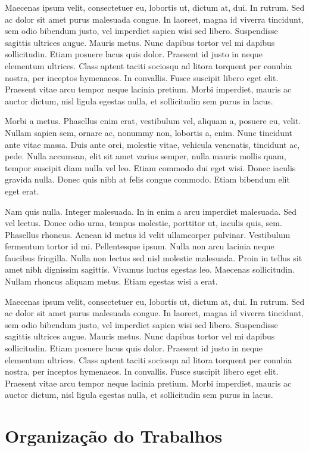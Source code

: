 Maecenas ipsum velit, consectetuer eu, lobortis ut, dictum at, dui. In rutrum. Sed ac dolor sit amet purus malesuada congue. In laoreet, magna id viverra tincidunt, sem odio bibendum justo, vel imperdiet sapien wisi sed libero. Suspendisse sagittis ultrices augue. Mauris metus. Nunc dapibus tortor vel mi dapibus sollicitudin. Etiam posuere lacus quis dolor. Praesent id justo in neque elementum ultrices. Class aptent taciti sociosqu ad litora torquent per conubia nostra, per inceptos hymenaeos. In convallis. Fusce suscipit libero eget elit. Praesent vitae arcu tempor neque lacinia pretium. Morbi imperdiet, mauris ac auctor dictum, nisl ligula egestas nulla, et sollicitudin sem purus in lacus.

Morbi a metus. Phasellus enim erat, vestibulum vel, aliquam a, posuere eu, velit. Nullam sapien sem, ornare ac, nonummy non, lobortis a, enim. Nunc tincidunt ante vitae massa. Duis ante orci, molestie vitae, vehicula venenatis, tincidunt ac, pede. Nulla accumsan, elit sit amet varius semper, nulla mauris mollis quam, tempor suscipit diam nulla vel leo. Etiam commodo dui eget wisi. Donec iaculis gravida nulla. Donec quis nibh at felis congue commodo. Etiam bibendum elit eget erat.

Nam quis nulla. Integer malesuada. In in enim a arcu imperdiet malesuada. Sed vel lectus. Donec odio urna, tempus molestie, porttitor ut, iaculis quis, sem. Phasellus rhoncus. Aenean id metus id velit ullamcorper pulvinar. Vestibulum fermentum tortor id mi. Pellentesque ipsum. Nulla non arcu lacinia neque faucibus fringilla. Nulla non lectus sed nisl molestie malesuada. Proin in tellus sit amet nibh dignissim sagittis. Vivamus luctus egestas leo. Maecenas sollicitudin. Nullam rhoncus aliquam metus. Etiam egestas wisi a erat.

Maecenas ipsum velit, consectetuer eu, lobortis ut, dictum at, dui. In rutrum. Sed ac dolor sit amet purus malesuada congue. In laoreet, magna id viverra tincidunt, sem odio bibendum justo, vel imperdiet sapien wisi sed libero. Suspendisse sagittis ultrices augue. Mauris metus. Nunc dapibus tortor vel mi dapibus sollicitudin. Etiam posuere lacus quis dolor. Praesent id justo in neque elementum ultrices. Class aptent taciti sociosqu ad litora torquent per conubia nostra, per inceptos hymenaeos. In convallis. Fusce suscipit libero eget elit. Praesent vitae arcu tempor neque lacinia pretium. Morbi imperdiet, mauris ac auctor dictum, nisl ligula egestas nulla, et sollicitudin sem purus in lacus.


\section{Organização do Trabalhos}

